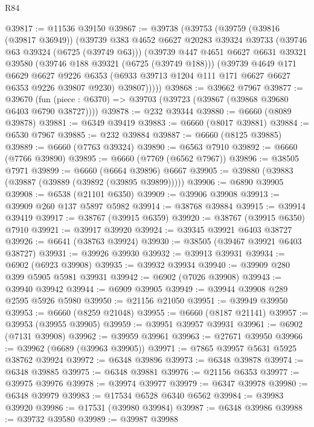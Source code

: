 \begin{lexlean}{R84}
\begin{coremodule}
@39817 := @11536 @39150
@39867 := @39738
    (@39753
      (@39759
        (@39816 (@39817 @36949))
        (@39739
          @383
          @4652
          @6627
          @20283
          @39324
          @39733
          (@39746 @63 @39324 (@6725 (@39749 @63)))
          (@39739
            @447
            @4651
            @6627
            @6631
            @39321
            @39580
            (@39746 @188 @39321 (@6725 (@39749 @188)))
            (@39739
              @4649
              @171
              @6629
              @6627
              @9226
              @6353
              (@6933 @39713 @1204 @111 @171 @6627 @6627 @6353 @9226 @39807 @9230)
              @39807)))))
@39868 := @39662 @7967
@39877 := @39670
    (fun (piece : @6370) => @39703 (@39723 (@39867 (@39868 @39680 @6403 @6790 @38727))))
@39878 := @232 @39344
@39880 := @6660 (@8089 @39878)
@39881 := @6349 @39419
@39883 := @6660 (@8017 @39881)
@39884 := @6530 @7967
@39885 := @232 @39884
@39887 := @6660 (@8125 @39885)
@39889 := @6660 (@7763 @39324)
@39890 := @6563 @7910
@39892 := @6660 (@7766 @39890)
@39895 := @6660 (@7769 (@6562 @7967))
@39896 := @38505 @7971
@39899 := @6660 (@6664 @39896) @6667
@39905 := @39880 (@39883 (@39887 (@39889 (@39892 (@39895 @39899)))))
@39906 := @6890 @39905
@39908 := @6538 (@21101 @6350)
@39909 := @39906 @39908
@39913 := @39909 @260 @137 @5897 @5982
@39914 := @38768 @39884
@39915 := @39914 @39419
@39917 := @38767 (@39915 @6359)
@39920 := @38767 (@39915 @6350) @7910
@39921 := @39917 @39920
@39924 := @39345 @39921 @6403 @38727
@39926 := @6641 (@38763 @39924)
@39930 := @38505 (@39467 @39921 @6403 @38727)
@39931 := @39926 @39930
@39932 := @39913 @39931
@39934 := @6902 (@6923 @39908)
@39935 := @39932 @39934
@39940 := @39909 @280 @399 @5905 @5981 @39931
@39942 := @6902 (@7026 @39908)
@39943 := @39940 @39942
@39944 := @6909 @39905
@39949 := @39944 @39908 @289 @2595 @5926 @5980
@39950 := @21156 @21050
@39951 := @39949 @39950
@39953 := @6660 (@8259 @21048)
@39955 := @6660 (@8187 @21141)
@39957 := @39953 (@39955 @39905)
@39959 := @39951 @39957 @39931
@39961 := @6902 (@7131 @39908)
@39962 := @39959 @39961
@39963 := @27671 @39950
@39966 := @39962 (@6689 (@39963 @39905))
@39971 := @7865 @39957 @5631 @5925 @38762 @39924
@39972 := @6348 @39896
@39973 := @6348 @39878
@39974 := @6348 @39885
@39975 := @6348 @39881
@39976 := @21156 @6353
@39977 := @39975 @39976
@39978 := @39974 @39977
@39979 := @6347 @39978
@39980 := @6348 @39979
@39983 := @17534 @6528 @6340 @6562
@39984 := @39983 @39920
@39986 := @17531 (@39980 @39984)
@39987 := @6348 @39986
@39988 := @39732 @39580
@39989 := @39987 @39988

\end{coremodule}
\end{lexlean}
